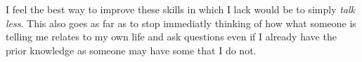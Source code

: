 \documentclass[stu,12pt]{apa7}
\begin{document}
      I feel the best way to improve these skills in which I lack would be to
        simply \emph{talk less}. This also goes as far as to stop immediatly
        thinking of how what someone is telling me relates to my own life and
        ask questions even if I already have the prior knowledge as someone may
        have some that I do not.
\end{document}
